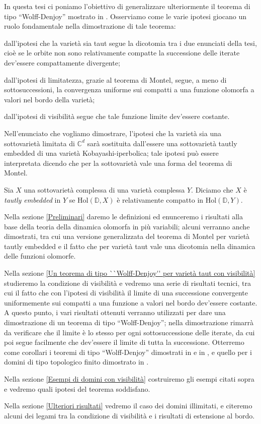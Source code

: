 In questa tesi ci poniamo l'obiettivo di generalizzare ulteriormente il teorema di tipo ``Wolff-Denjoy'' mostrato in \cite{CMS}. Osserviamo come le varie ipotesi giocano un ruolo fondamentale nella dimostrazione di tale teorema:
\begin{nlist}
    \item dall'ipotesi che la varietà sia taut segue la dicotomia tra i due enunciati della tesi, cioè se le orbite non sono relativamente compatte la successione delle iterate dev'essere compattamente divergente;
    \item dall'ipotesi di limitatezza, grazie al teorema di Montel, segue, a meno di sottosuccessioni, la convergenza uniforme sui compatti a una funzione olomorfa a valori nel bordo della varietà;
    \item dall'ipotesi di visibilità segue che tale funzione limite dev'essere costante.
\end{nlist}

Nell'enunciato che vogliamo dimostrare, l'ipotesi che la varietà sia una sottovarietà limitata di $\mathbb{C}^d$ sarà sostituita dall'essere una sottovarietà tautly embedded di una varietà Kobayashi-iperbolica; tale ipotesi può essere interpretata dicendo che per la sottovarietà vale una forma del teorema di Montel.

\begin{defn}
    Sia $X$ una sottovarietà complessa di una varietà complessa $Y$. Diciamo che $X$ è \textit{tautly embedded} in $Y$ se $\text{Hol}(\mathbb{D},X)$ è relativamente compatto in $\text{Hol}(\mathbb{D},Y)$.
\end{defn}

Nella sezione \ref{Preliminari} daremo le definizioni ed enunceremo i risultati alla base della teoria della dinamica olomorfa in più variabili; alcuni verranno anche dimostrati, tra cui una versione generalizzata del teorema di Montel per varietà tautly embedded e il fatto che per varietà taut vale una dicotomia nella dinamica delle funzioni olomorfe.

Nella sezione \ref{Un teorema di tipo ``Wolff-Denjoy'' per varietà taut con visibilità} studieremo la condizione di visibilità e vedremo una serie di risultati tecnici, tra cui il fatto che con l'ipotesi di visibilità il limite di una successione convergente uniformemente sui compatti a una funzione a valori nel bordo dev'essere costante. A questo punto, i vari risultati ottenuti verranno utilizzati per dare una dimostrazione di un teorema di tipo ``Wolff-Denjoy''; nella dimostrazione rimarrà da verificare che il limite è lo stesso per ogni sottosuccessione delle iterate, da cui poi segue facilmente che dev'essere il limite di tutta la successione. Otterremo come corollari i teoremi di tipo ``Wolff-Denjoy'' dimostrati in \cite{A2} e in \cite{CMS}, e quello per i domini di tipo topologico finito dimostrato in \cite{BM}.

Nella sezione \ref{Esempi di domini con visibilità} costruiremo gli esempi citati sopra e vedremo quali ipotesi del teorema soddisfano.

Nella sezione \ref{Ulteriori risultati} vedremo il caso dei domini illimitati, e citeremo alcuni dei legami tra la condizione di visibilità e i risultati di estensione al bordo.